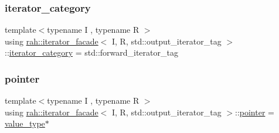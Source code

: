 \subsubsection{\texorpdfstring{iterator\_category}{iterator\_category}}
{\footnotesize\ttfamily template$<$typename I , typename R $>$ \\
using \mbox{\hyperlink{structrah_1_1iterator__facade}{rah\+::iterator\+\_\+facade}}$<$ I, R, std\+::output\+\_\+iterator\+\_\+tag $>$\+::\mbox{\hyperlink{structrah_1_1iterator__facade_3_01_i_00_01_r_00_01std_1_1output__iterator__tag_01_4_aea9805a7e6e6fa707e827522d25a2c62}{iterator\+\_\+category}} =  std\+::forward\+\_\+iterator\+\_\+tag}

\mbox{\label{structrah_1_1iterator__facade_3_01_i_00_01_r_00_01std_1_1output__iterator__tag_01_4_a7d1e657a8d01cc9f8adca5477b017ccb}} 
\subsubsection{\texorpdfstring{pointer}{pointer}}
{\footnotesize\ttfamily template$<$typename I , typename R $>$ \\
using \mbox{\hyperlink{structrah_1_1iterator__facade}{rah\+::iterator\+\_\+facade}}$<$ I, R, std\+::output\+\_\+iterator\+\_\+tag $>$\+::\mbox{\hyperlink{structrah_1_1iterator__facade_3_01_i_00_01_r_00_01std_1_1output__iterator__tag_01_4_a7d1e657a8d01cc9f8adca5477b017ccb}{pointer}} =  \mbox{\hyperlink{structrah_1_1iterator__facade_3_01_i_00_01_r_00_01std_1_1output__iterator__tag_01_4_aeafcf4359545a589d72a23f8500e9b74}{value\+\_\+type}}$\ast$}

\mbox{\label{structrah_1_1iterator__facade_3_01_i_00_01_r_00_01std_1_1output__iterator__tag_01_4_aa6a95e1b55444933973b7fe4a63512e2}} 
